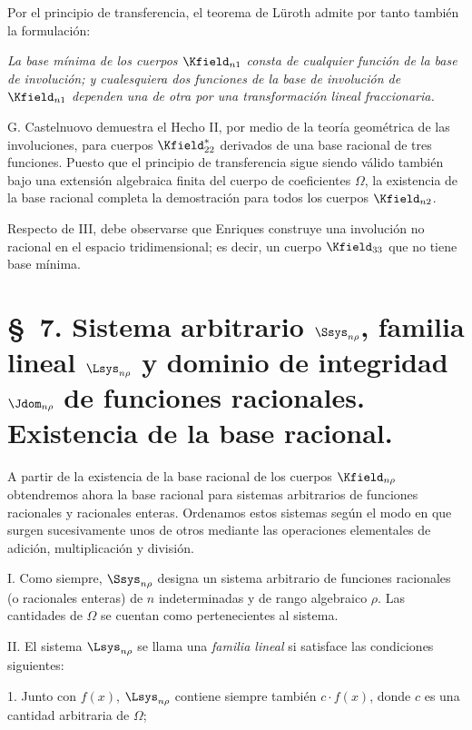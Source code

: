\documentclass[11pt]{article}
\newcommand{\eps}{\varepsilon}
\begin{document}
Por el principio de transferencia, el teorema de Lüroth admite por tanto también la formulación:

\emph{La base mínima de los cuerpos $\Kfield_{n1}$ consta de cualquier función de la base de involución; y cualesquiera dos funciones de la base de involución de $\Kfield_{n1}$ dependen una de otra por una transformación lineal fraccionaria.}

G. Castelnuovo demuestra el Hecho II, por medio de la teoría geométrica de las involuciones, para cuerpos $\Kfield^*_{22}$ derivados de una base racional de tres funciones. Puesto que el principio de transferencia sigue siendo válido también bajo una extensión algebraica finita del cuerpo de coeficientes $\Omega$, la existencia de la base racional completa la demostración para todos los cuerpos $\Kfield_{n2}$.

Respecto de III, debe observarse que Enriques construye una involución no racional en el espacio tridimensional; es decir, un cuerpo $\Kfield_{33}$ que no tiene base mínima.


\providecommand{\Gdom}{\mathfrak{G}}
\providecommand{\Omegaint}{[\Omega]}
\providecommand{\eps}{\varepsilon}

\clearpage
\section*{\S\ 7. Sistema arbitrario $\Ssys_{n\rho}$, familia lineal $\Lsys_{n\rho}$ y dominio de integridad $\Jdom_{n\rho}$ de funciones racionales. Existencia de la base racional.}

A partir de la existencia de la base racional de los cuerpos $\Kfield_{n\rho}$ obtendremos ahora la base racional para sistemas arbitrarios de funciones racionales y racionales enteras. Ordenamos estos sistemas según el modo en que surgen sucesivamente unos de otros mediante las operaciones elementales de adición, multiplicación y división.

I. Como siempre, $\Ssys_{n\rho}$ designa un sistema arbitrario de funciones racionales (o racionales enteras) de $n$ indeterminadas y de rango algebraico $\rho$. Las cantidades de $\Omega$ se cuentan como pertenecientes al sistema.

II. El sistema $\Lsys_{n\rho}$ se llama una \emph{familia lineal} si satisface las condiciones siguientes:

1. Junto con $f(x)$, $\Lsys_{n\rho}$ contiene siempre también $c\cdot f(x)$, donde $c$ es una cantidad arbitraria de $\Omega$;
\end{document}
